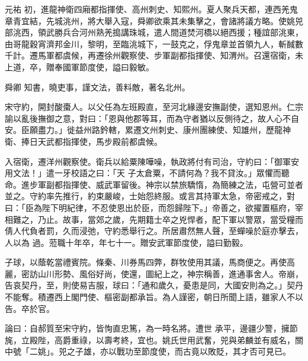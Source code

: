 \begin{pinyinscope}
 元祐
 初，進龍神衛四廂都指揮使、高州刺史、知熙州。夏人聚兵天都，連西羌鬼章青宜結，先城洮州，將大舉入寇，舜卿欲乘其未集擊之，會諸將議方略。使姚兕部洮西，領武勝兵合河州熟羌搗講珠城，遣人間道焚河橋以絕西援；種誼部洮東，由哥龍穀宵濟邦金川，黎明，至臨洮城下，一鼓克之，俘鬼章並首領九人，斬馘數千計。遷馬軍都虞候，再遷徐州觀察使、步軍副都指揮使、知渭州。召還宿衛，未上道，卒，贈奉國軍節度使，謚曰毅敏。



 舜卿
 知書，曉吏事，謹文法，善料敵，著名北州。



 宋守約，開封酸棗人。以父任為左班殿直，至河北緣邊安撫副使，選知恩州。仁宗諭以亂後撫御之意，對曰：「恩與他郡等耳，而為守者猶以反側待之，故人心不自安。臣願盡力。」徙益州路鈐轄，累遷文州刺史、康州團練使、知雄州，歷龍神衛、捧日天武都指揮使，馬步殿前都虞候。



 入宿衛，遷洋州觀察使。衛兵以給粟陳嘩噪，執政將付有司治，守約曰：「御軍安用文法！」遣一牙校語之曰：「天
 子太倉粟，不請何為？我不貸汝。」眾懼而聽命。進步軍副都指揮使、威武軍留後。神宗以禁旅驕惰，為簡練之法，屯營可並者並之。守約率先推行，約束嚴峻，士始怨終服。或言其持軍太急，帝密戒之，對曰：「臣為陛下明紀律，不忍使恩出於臣，而怨歸陛下。」帝善之，欲擢置樞府，宰相難之，乃止。故事，當郊之歲，先期籍士卒之兇悍者，配下軍以警眾，當受糧而倩人代負者罰，久而浸弛，守約悉舉行之。所居肅然無人聲，至蟬噪於庭亦擊去，人以為
 過。蒞職十年卒，年七十一。贈安武軍節度使，謚曰勤毅。



 子球，以蔭乾當禮賓院。條秦、川券馬四弊，群牧使用其議，馬商便之。再使高麗，密訪山川形勢、風俗好尚，使還，圖紀上之，神宗稱善，進通事舍人。帝崩，告哀契丹，至，則使易吉服，球曰：「通和歲久，憂患是同，大國安則為之。」契丹不能奪。積遷西上閣門使、樞密副都承旨。為人謹密，朝日所聞上語，雖家人不以告。卒於官。



 論曰：自郝質至宋守約，皆恂直忠篤，為一時名將。遭世
 承平，邊疆少警，擁節旄，立殿陛，高爵重祿，以壽考終，宜也。姚氏世用武奮，兕與弟麟並有威名，關中號「二姚」。兕之子雄，亦以戰功至節度使，而古竟以敗貶，其才否可見已。



\end{pinyinscope}